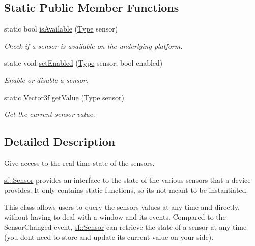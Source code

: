 \subsection*{Static Public Member Functions}
\begin{DoxyCompactItemize}
\item 
static bool \mbox{\hyperlink{classsf_1_1_sensor_a7b7a2570218221781233bd495323abf0}{is\+Available}} (\mbox{\hyperlink{classsf_1_1_sensor_a687375af3ab77b818fca73735bcaea84}{Type}} sensor)
\begin{DoxyCompactList}\small\item\em Check if a sensor is available on the underlying platform. \end{DoxyCompactList}\item 
static void \mbox{\hyperlink{classsf_1_1_sensor_afb31c5697d2e0a5fec70d702ec1d6cd9}{set\+Enabled}} (\mbox{\hyperlink{classsf_1_1_sensor_a687375af3ab77b818fca73735bcaea84}{Type}} sensor, bool enabled)
\begin{DoxyCompactList}\small\item\em Enable or disable a sensor. \end{DoxyCompactList}\item 
static \mbox{\hyperlink{classsf_1_1_vector3}{Vector3f}} \mbox{\hyperlink{classsf_1_1_sensor_ab9a2710f55ead2f7b4e1b0bead34457e}{get\+Value}} (\mbox{\hyperlink{classsf_1_1_sensor_a687375af3ab77b818fca73735bcaea84}{Type}} sensor)
\begin{DoxyCompactList}\small\item\em Get the current sensor value. \end{DoxyCompactList}\end{DoxyCompactItemize}


\subsection{Detailed Description}
Give access to the real-\/time state of the sensors. 

\begin{DoxyVerb}\end{DoxyVerb}


\mbox{\hyperlink{classsf_1_1_sensor}{sf\+::\+Sensor}} provides an interface to the state of the various sensors that a device provides. It only contains static functions, so it\textquotesingle{}s not meant to be instantiated.

This class allows users to query the sensors values at any time and directly, without having to deal with a window and its events. Compared to the Sensor\+Changed event, \mbox{\hyperlink{classsf_1_1_sensor}{sf\+::\+Sensor}} can retrieve the state of a sensor at any time (you don\textquotesingle{}t need to store and update its current value on your side).

